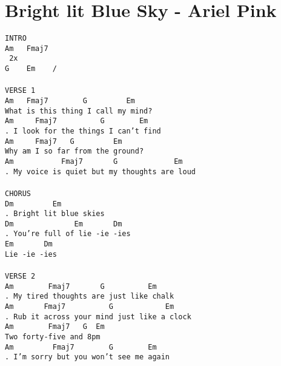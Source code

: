 \newpage
\section{Bright lit Blue Sky - Ariel Pink}
\label{Bright lit Blue Sky - Ariel Pink}
\texttt{INTRO\\
Am\ \ \ Fmaj7\ \\\ 2x\\
G\ \ \ \ Em\ \ \ \ /\\
\\
VERSE\ 1\\
Am\ \ \ Fmaj7\ \ \ \ \ \ \ \ G\ \ \ \ \ \ \ \ \ Em\\
What\ is\ this\ thing\ I\ call\ my\ mind?\\
Am\ \ \ \ \ Fmaj7\ \ \ \ \ \ \ \ \ \ G\ \ \ \ \ \ \ \ Em\\
. I\ look\ for\ the\ things\ I\ can't\ find\\
Am\ \ \ \ \ Fmaj7\ \ \ G\ \ \ \ \ \ \ \ \ Em\\
Why\ am\ I\ so\ far\ from\ the\ ground?\\
Am\ \ \ \ \ \ \ \ \ \ \ Fmaj7\ \ \ \ \ \ \ G\ \ \ \ \ \ \ \ \ \ \ \ \ Em\\
. My\ voice\ is\ quiet\ but\ my\ thoughts\ are\ loud\\
\\
CHORUS\\
Dm\ \ \ \ \ \ \ \ \ Em\\
. Bright\ lit\ blue\ skies\\
Dm\ \ \ \ \ \ \ \ \ \ \ \ \ \ Em\ \ \ \ \ \ \ Dm\\
. You're\ full\ of\ lie\ -ie\ -ies\\
Em\ \ \ \ \ \ \ Dm\\
Lie\ -ie\ -ies\\
\\
VERSE\ 2\\
Am\ \ \ \ \ \ \ \ Fmaj7\ \ \ \ \ \ \ G\ \ \ \ \ \ \ \ \ \ Em\\
. My\ tired\ thoughts\ are\ just\ like\ chalk\\
Am\ \ \ \ \ \ \ Fmaj7\ \ \ \ \ \ \ \ \ \ G\ \ \ \ \ \ \ \ \ \ \ \ Em\\
. Rub\ it\ across\ your\ mind\ just\ like\ a\ clock\\
Am\ \ \ \ \ \ \ \ Fmaj7\ \ \ G\ \ Em\\
Two\ forty-five\ and\ 8pm\\
Am\ \ \ \ \ \ \ \ \ Fmaj7\ \ \ \ \ \ \ \ G\ \ \ \ \ \ \ \ Em\\
. I'm\ sorry\ but\ you\ won't\ see\ me\ again\\
}
